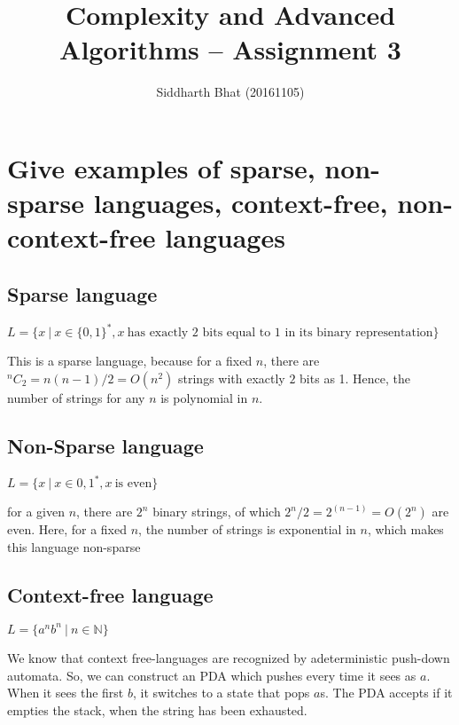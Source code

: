 \documentclass{article}
\author{Siddharth Bhat (20161105)}
\title{Complexity and Advanced Algorithms -- Assignment 3}
\newcommand*{\Comb}[2]{{}^{#1}C_{#2}}%
\begin{document}
\newcommand{\threesat}{\texttt{3-SAT}~}
\newcommand{\pspace}{\texttt{PSPACE}~}
\newcommand{\np}{\texttt{NP}~}
\newcommand{\nat}{\mathbb{N}~}
\newcommand{\pred}{\mathbb{P}~}
\newcommand{\logspace}{\texttt{LOGSPACE}~}
\newcommand{\nlogspace}{\texttt{NLOGSPACE}~}
\newcommand{\ptime}{\texttt{P}~}
\newcommand{\nptime}{\texttt{NP}~}
\maketitle

\section{Give examples of sparse, non-sparse languages, context-free, non-context-free languages}

\subsection{Sparse language}

$L = \{ x~\vert~x \in \{0, 1\}^*, x~\text{has exactly $2$ bits equal to $1$ in its binary representation} \}$

This is a sparse language, because for a fixed $n$, there are $\Comb{n}{2} = n(n-1)/2 =
O(n^2)$ strings with  exactly $2$ bits as 1. Hence, the number of strings
for any $n$ is polynomial in $n$.


\subsection{Non-Sparse language}
$L = \{ x~\vert~ x \in {0, 1}^*, x~\text{is even} \}$

for a given $n$, there are $2^n$ binary strings, of which $2^n/2 = 2^{(n - 1)} = O(2^n)$
are even. Here, for a fixed $n$, the number of strings is exponential in $n$,
which makes this language non-sparse

\subsection{Context-free language}
$L = \{ a^nb^n~\vert~n \in \mathbb{N} \}$

We know that context free-languages are recognized by adeterministic 
push-down automata. So, we can construct an PDA which pushes 
every time it sees as $a$. When it sees the first $b$, it switches to a state
that pops $a$s. The PDA accepts if it empties the stack, when the string
has been exhausted.
\end{document}
